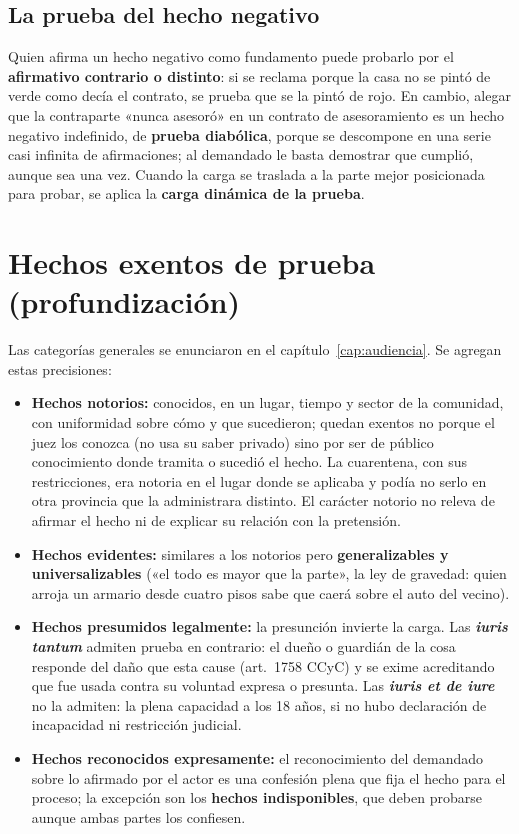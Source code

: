 \documentclass[12pt,oneside]{book}
\begin{document}
\subsection{La prueba del hecho negativo}

Quien afirma un hecho negativo como fundamento puede probarlo por el \textbf{afirmativo contrario o distinto}: si se reclama porque la casa no se pintó de verde como decía el contrato, se prueba que se la pintó de rojo. En cambio, alegar que la contraparte «nunca asesoró» en un contrato de asesoramiento es un hecho negativo indefinido, de \textbf{prueba diabólica}, porque se descompone en una serie casi infinita de afirmaciones; al demandado le basta demostrar que cumplió, aunque sea una vez. Cuando la carga se traslada a la parte mejor posicionada para probar, se aplica la \textbf{carga dinámica de la prueba}.

\section{Hechos exentos de prueba (profundización)}

Las categorías generales se enunciaron en el capítulo~\ref{cap:audiencia}. Se agregan estas precisiones:

\begin{itemize}
\item \textbf{Hechos notorios:} conocidos, en un lugar, tiempo y sector de la comunidad, con uniformidad sobre cómo y que sucedieron; quedan exentos no porque el juez los conozca (no usa su saber privado) sino por ser de público conocimiento donde tramita o sucedió el hecho. La cuarentena, con sus restricciones, era notoria en el lugar donde se aplicaba y podía no serlo en otra provincia que la administrara distinto. El carácter notorio no releva de afirmar el hecho ni de explicar su relación con la pretensión.
\item \textbf{Hechos evidentes:} similares a los notorios pero \textbf{generalizables y universalizables} («el todo es mayor que la parte», la ley de gravedad: quien arroja un armario desde cuatro pisos sabe que caerá sobre el auto del vecino).
\item \textbf{Hechos presumidos legalmente:} la presunción invierte la carga. Las \textbf{\textit{iuris tantum}} admiten prueba en contrario: el dueño o guardián de la cosa responde del daño que esta cause (art.~1758 CCyC) y se exime acreditando que fue usada contra su voluntad expresa o presunta. Las \textbf{\textit{iuris et de iure}} no la admiten: la plena capacidad a los 18 años, si no hubo declaración de incapacidad ni restricción judicial.
\item \textbf{Hechos reconocidos expresamente:} el reconocimiento del demandado sobre lo afirmado por el actor es una confesión plena que fija el hecho para el proceso; la excepción son los \textbf{hechos indisponibles}, que deben probarse aunque ambas partes los confiesen.
\end{itemize}
\end{document}
